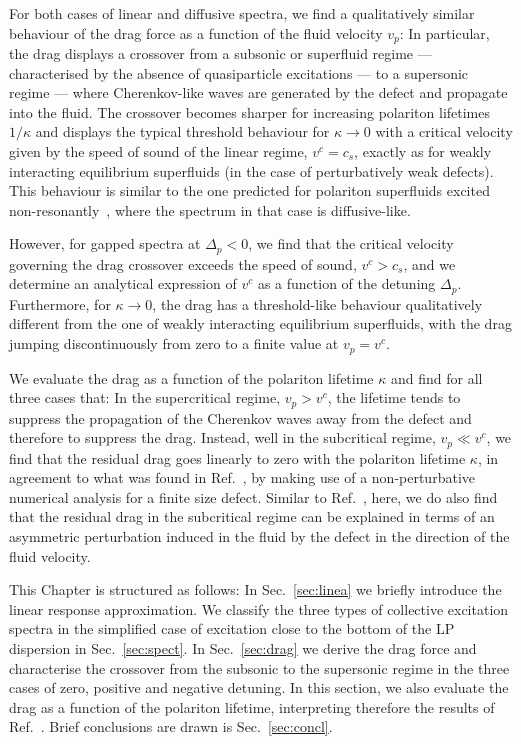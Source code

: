 For both cases of linear and diffusive spectra, we find a
qualitatively similar behaviour of the drag force as a function of the
fluid velocity $v_p$: In particular, the drag displays a crossover
from a subsonic or superfluid regime --- characterised by the absence
of quasiparticle excitations --- to a supersonic regime --- where
Cherenkov-like waves are generated by the defect and propagate into
the fluid. The crossover becomes sharper for increasing polariton
lifetimes $1/\kappa$ and displays the typical threshold behaviour for
$\kappa \to 0$ with a critical velocity given by the speed of sound of
the linear regime, $v^c= c_s$, exactly as for weakly interacting
equilibrium superfluids (in the case of perturbatively weak
defects). This behaviour is similar to the one predicted for polariton
superfluids excited non-resonantly~\cite{Wouters_2010}, where the
spectrum in that case is diffusive-like.

However, for gapped spectra at $\Delta_p <0$, we find that the
critical velocity governing the drag crossover exceeds the speed of
sound, $v^c > c_s$, and we determine an analytical expression of $v^c$
as a function of the detuning $\Delta_p$. Furthermore, for $\kappa \to 0$,
the drag has a threshold-like behaviour qualitatively different from
the one of weakly interacting equilibrium superfluids, with the drag
jumping discontinuously from zero to a finite value at $v_p=v^c$.

We evaluate the drag as a function of the polariton lifetime $\kappa$
and find for all three cases that: In the supercritical regime,
$v_p>v^c$, the lifetime tends to suppress the propagation of the
Cherenkov waves away from the defect and therefore to suppress the
drag. Instead, well in the subcritical regime, $v_p \ll v^c$, we find
that the residual drag goes linearly to zero with the polariton
lifetime $\kappa$, in agreement to what  was found in
Ref.~\cite{Cancellieri_2010}, by making use of a non-perturbative
numerical analysis for a finite size defect. Similar to
Ref.~\cite{Cancellieri_2010}, here, we do also find that the residual
drag in the subcritical regime can be explained in terms of an
asymmetric perturbation induced in the fluid by the defect in the
direction of the fluid velocity.

This Chapter is structured as follows: In Sec.~\ref{sec:linea} we
briefly introduce the linear response approximation. We classify the
three types of collective excitation spectra in the simplified case of
excitation close to the bottom of the LP dispersion in
Sec.~\ref{sec:spect}. In Sec.~\ref{sec:drag} we derive the drag force
and characterise the crossover from the subsonic to the supersonic
regime in the three cases of zero, positive and negative detuning. In
this section, we also evaluate the drag as a function of the polariton
lifetime, interpreting therefore the results of
Ref.~\cite{Cancellieri_2010}.  Brief conclusions are drawn is
Sec.~\ref{sec:concl}.



